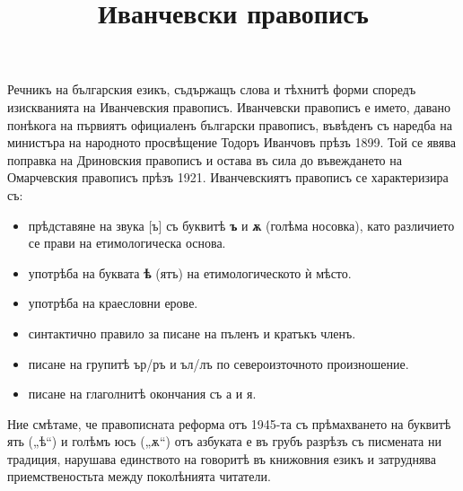 \documentclass{article}
\begin{document}
	\title{Иванчевски правописъ}
\maketitle

Речникъ на българския езикъ, съдържащъ слова и тѣхнитѣ форми споредъ изискванията на Иванчевския правописъ. 
Иванчевски правописъ е името, давано понѣкога на първиятъ официаленъ български правописъ, 
въвѣденъ съ наредба на министъра на народното просвѣщение Тодоръ Иванчовъ прѣзъ 1899.
Той се явява поправка на Дриновския правописъ и остава въ сила до въвеждането на Омарчевския правописъ прѣзъ 1921. 
Иванчевскиятъ правописъ се характеризира съ:
%
\begin{itemize}
	\item прѣдставяне на звука [ъ] съ буквитѣ \textbf{ъ} и \textbf{ѫ} (голѣма носовка), като различието се прави на етимологическа основа.
	\item употрѣба на буквата \textbf{ѣ} (ятъ) на етимологическото ѝ мѣсто.
	\item употрѣба на краесловни ерове.
	\item синтактично правило за писане на пъленъ и кратъкъ членъ.
	\item писане на групитѣ ър/ръ и ъл/лъ по североизточното произношение.
	\item писане на глаголнитѣ окончания съ а и я.
\end{itemize}


Ние смѣтаме, че правописната реформа отъ 1945-та съ прѣмахването на буквитѣ ять („ѣ“) и голѣмъ юсъ („ѫ“) отъ азбуката е въ грубъ разрѣзъ съ писмената ни традиция, нарушава единството на говоритѣ въ книжовния езикъ и затруднява приемственостьта между поколѣнията читатели.

%
%	
%	
%	
\end{document}
